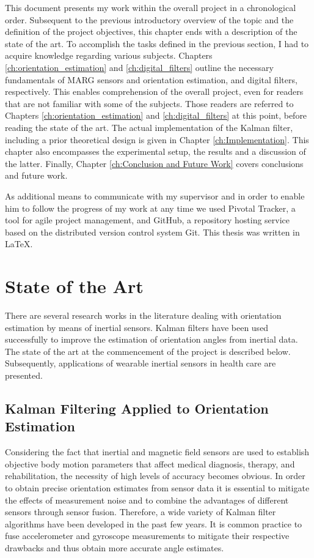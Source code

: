 This document presents my work within the overall project in a chronological order. Subsequent to the previous introductory overview of the topic and the definition of the project objectives, this chapter ends with a description of the state of the art. To accomplish the tasks defined in the previous section, I had to acquire knowledge regarding various subjects. Chapters \ref{ch:orientation_estimation} and \ref{ch:digital_filters} outline the necessary fundamentals of MARG sensors and orientation estimation, and digital filters, respectively. This enables comprehension of the overall project, even for readers that are not familiar with some of the subjects. Those readers are referred to Chapters \ref{ch:orientation_estimation} and \ref{ch:digital_filters} at this point, before reading the state of the art. The actual implementation of the Kalman filter, including a prior theoretical design is given in Chapter \ref{ch:Implementation}. This chapter also encompasses the experimental setup, the results and a discussion of the latter. Finally, Chapter \ref{ch:Conclusion and Future Work} covers conclusions and future work.

As additional means to communicate with my supervisor and in order to enable him to follow the progress of my work at any time we used Pivotal Tracker, a tool for agile project management, and GitHub, a repository hosting service based on the distributed version control system Git. This thesis was written in \LaTeX{}.
 
\section{State of the Art}\label{sec:state_of_the_art}

There are several research works in the literature dealing with orientation estimation by means of inertial sensors. Kalman filters have been used successfully to improve the estimation of orientation angles from inertial data. The state of the art at the commencement of the project is described below. Subsequently, applications of wearable inertial sensors in health care are presented.

\subsection{Kalman Filtering Applied to Orientation Estimation} \label{sec:state_of_the_art_kalman}

Considering the fact that inertial and magnetic field sensors are used to establish objective body motion parameters that affect medical diagnosis, therapy, and rehabilitation, the necessity of high levels of accuracy becomes obvious. In order to obtain precise orientation estimates from sensor data it is essential to mitigate the effects of measurement noise and to combine the advantages of different  sensors through sensor fusion. Therefore, a wide variety of Kalman filter algorithms have been developed in the past few years. It is common practice to fuse accelerometer and gyroscope measurements to mitigate their respective drawbacks and thus obtain more accurate angle estimates.

